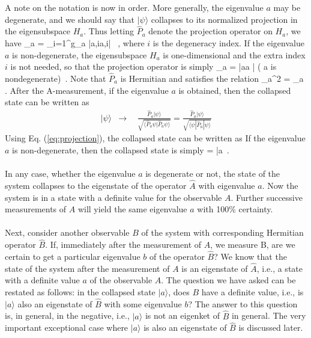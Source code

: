 A note on the notation is now in order. More generally, the eigenvalue $a$ may be degenerate, and  we should say that 
 $|\psi\rangle$ collapses to its normalized projection in the eigensubspace $H_a$. Thus letting $\hat{P}_a$ denote the projection operator on $H_a$, we have
\be
 _a = \sum_{i=1}^{g_a} |a,i\rangle \langle a,i| \, , 
\label{eq:projection}
\ee
where $i$ is the degeneracy index.  If the eigenvalue $a$ is non-degenerate,  the eigensubspace $H_a$ is
one-dimensional and the extra index $i$ is not needed, so that the projection operator is simply
\be
{}_a = |a\rangle \langle a | \quad ( a\; {\rm is\; nondegenerate})\, . 
\ee
Note that $\hat{P}_a$ is Hermitian and satisfies the relation
\be
{}_a^2 = _a\, .
\ee
After the A-measurement, if the eigenvalue $a$ is obtained, then the collapsed state can be written as
\begin{eqnarray}
|\psi\rangle & \longrightarrow & 
~~\frac{\hat{P}_a|\psi\rangle}{\sqrt{\langle\hat{P}_a\psi|\hat{P}_a\psi\rangle}} =
	\frac{\hat{P}_a|\psi\rangle}{\sqrt{\langle\psi|\hat{P}_a|\psi\rangle}}
\end{eqnarray}	
Using Eq. (\ref{eq:projection}), the collapsed state can be written as
\be
\psi \longrightarrow \; 
                            { }
\ee			
If the eigenvalue $a$ is non-degenerate, then the collapsed state is simply
\be											
\psi \longrightarrow \; 
                            { } = |a\rangle\, .
\ee

\paragraph{}
In any case, whether the eigenvalue $a$ is degenerate or not, the state of the system collapses to the eigenstate of 
the operator $\hat{A}$ with eigenvalue $a$. Now the system is in a state with a definite value for the observable $A$. Further successive measurements of $A$ will yield the same eigenvalue $a$ with 100\% certainty. 

\paragraph{}
Next, consider another observable $B$ of the system with corresponding Hermitian operator $\hat{B}$. If, immediately after the  measurement of $A$, we measure B, are we certain to get a particular eigenvalue $b$ of the operator $\hat{B}$?
We know that the state of the system after the measurement of $A$ is an eigenstate of $\hat{A}$, i.e., a state with a definite value $a$ of the observable $A$. The question we have asked can be restated as follows: in the collapsed state
$|a\rangle$, does $B$ have a definite value, i.e., is $|a\rangle$ also an eigenstate of $\hat{B}$  with some eigenvalue $b$? The answer to this question is, in general, in the negative, i.e., $|a\rangle$ is not an eigenket of $\hat{B}$ in general. The very important exceptional case 
where $|a\rangle$ is also an eigenstate of $\hat{B}$ is discussed later.

